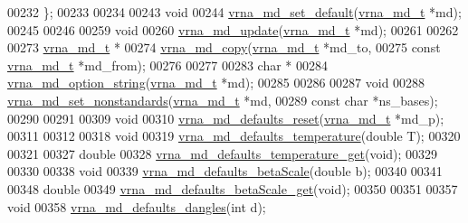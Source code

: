 \begin{DoxyCode}
00232 \};
00233 
00234 
00243 \textcolor{keywordtype}{void}
00244 \mbox{\hyperlink{group__model__details_ga8ac6ff84936282436f822644bf841f66}{vrna\_md\_set\_default}}(\mbox{\hyperlink{group__model__details_structvrna__md__s}{vrna\_md\_t}} *md);
00245 
00246 
00259 \textcolor{keywordtype}{void}
00260 \mbox{\hyperlink{group__model__details_ga36ae40b8c3b82362f5798ad5b047b814}{vrna\_md\_update}}(\mbox{\hyperlink{group__model__details_structvrna__md__s}{vrna\_md\_t}} *md);
00261 
00262 
00273 \mbox{\hyperlink{group__model__details_structvrna__md__s}{vrna\_md\_t}} *
00274 \mbox{\hyperlink{group__model__details_ga619057a740918b5fb01808362bb67aea}{vrna\_md\_copy}}(\mbox{\hyperlink{group__model__details_structvrna__md__s}{vrna\_md\_t}}        *md\_to,
00275              \textcolor{keyword}{const} \mbox{\hyperlink{group__model__details_structvrna__md__s}{vrna\_md\_t}}  *md\_from);
00276 
00277 
00283 \textcolor{keywordtype}{char} *
00284 \mbox{\hyperlink{group__model__details_ga3a7469f0725a849af6ba61a57dfd60ce}{vrna\_md\_option\_string}}(\mbox{\hyperlink{group__model__details_structvrna__md__s}{vrna\_md\_t}} *md);
00285 
00286 
00287 \textcolor{keywordtype}{void}
00288 \mbox{\hyperlink{group__model__details_ga87398a419421bf5d90f246382e6ed70c}{vrna\_md\_set\_nonstandards}}(\mbox{\hyperlink{group__model__details_structvrna__md__s}{vrna\_md\_t}}  *md,
00289                          \textcolor{keyword}{const} \textcolor{keywordtype}{char} *ns\_bases);
00290 
00291 
00309 \textcolor{keywordtype}{void}
00310 \mbox{\hyperlink{group__model__details_ga70834424cf804d149937de89f80ceb45}{vrna\_md\_defaults\_reset}}(\mbox{\hyperlink{group__model__details_structvrna__md__s}{vrna\_md\_t}} *md\_p);
00311 
00312 
00318 \textcolor{keywordtype}{void}
00319 \mbox{\hyperlink{group__model__details_gaf9e527e9a2f7e6fd6e42bc6e602f5445}{vrna\_md\_defaults\_temperature}}(\textcolor{keywordtype}{double} T);
00320 
00321 
00327 \textcolor{keywordtype}{double}
00328 \mbox{\hyperlink{group__model__details_ga96b24a74437f9ba46c4e06343155bf46}{vrna\_md\_defaults\_temperature\_get}}(\textcolor{keywordtype}{void});
00329 
00330 
00338 \textcolor{keywordtype}{void}
00339 \mbox{\hyperlink{group__model__details_gae984567db36c3f9b8731ecc917abf3a2}{vrna\_md\_defaults\_betaScale}}(\textcolor{keywordtype}{double} b);
00340 
00341 
00348 \textcolor{keywordtype}{double}
00349 \mbox{\hyperlink{group__model__details_gabb8780f5410c52f970d75b044059bd09}{vrna\_md\_defaults\_betaScale\_get}}(\textcolor{keywordtype}{void});
00350 
00351 
00357 \textcolor{keywordtype}{void}
00358 \mbox{\hyperlink{group__model__details_gac76a5374def8e5e4e644ff6e4cc72dee}{vrna\_md\_defaults\_dangles}}(\textcolor{keywordtype}{int} d);

\end{DoxyCode}
